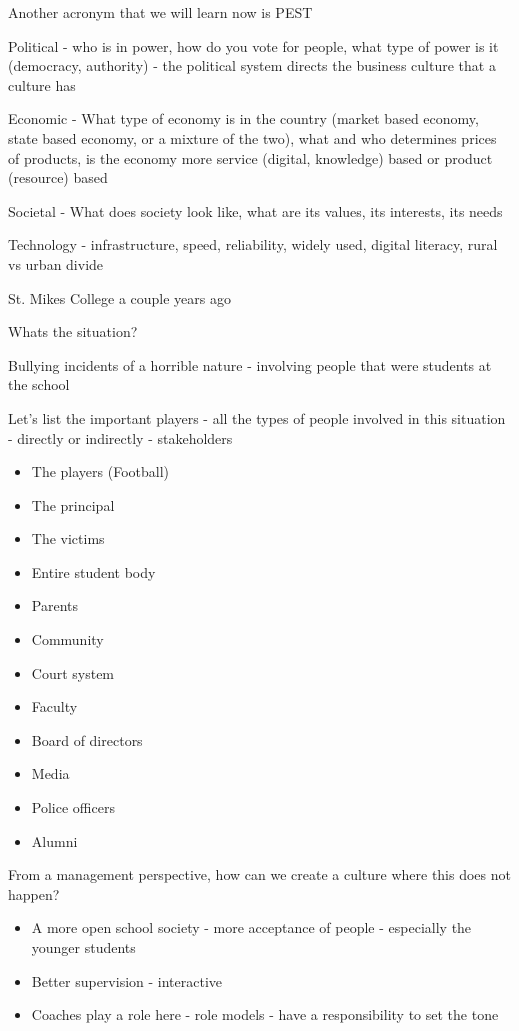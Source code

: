 \documentclass[11pt]{article}
\begin{document}
Another acronym that we will learn now is PEST

Political - who is in power, how do you vote for people, what type of power is it (democracy, authority) - the political system directs the business culture that a culture has 

Economic - What type of economy is in the country (market based economy, state based economy, or a mixture of the two), what and who determines prices of products, is the economy more service (digital, knowledge) based or product (resource) based

Societal - What does society look like, what are its values, its interests, its needs

Technology - infrastructure, speed, reliability, widely used, digital literacy, rural vs urban divide

St. Mikes College a couple years ago

Whats the situation?

Bullying incidents of a horrible nature - involving people that were students at the school 

Let's list the important players - all the types of people involved in this situation - directly or indirectly - stakeholders

\begin{itemize}
    \item The players (Football)
    \item The principal
    \item The victims
    \item Entire student body
    \item Parents
    \item Community
    \item Court system
    \item Faculty
    \item Board of directors
    \item Media
    \item Police officers
    \item Alumni
\end{itemize}

From a management perspective, how can we create a culture where this does not happen?

\begin{itemize}
    \item A more open school society - more acceptance of people - especially the younger students
    \item Better supervision - interactive
    \item Coaches play a role here - role models - have a responsibility to set the tone
\end{itemize}
\end{document}
